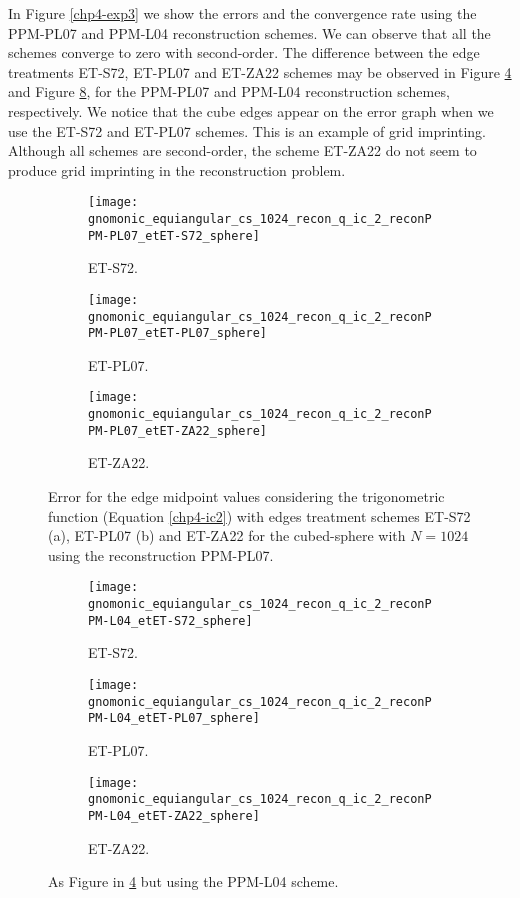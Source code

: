 In Figure \ref{chp4-exp3} we show the errors and the convergence rate using the PPM-PL07 and PPM-L04 reconstruction schemes.
We can observe that all the schemes converge to zero with second-order.
The difference between the edge treatments ET-S72, ET-PL07 and ET-ZA22 schemes
may be observed in Figure \ref{chp4-exp4} and Figure \ref{chp4-exp5}, for the  PPM-PL07 and PPM-L04 reconstruction schemes, respectively.
We notice that the cube edges appear on the error graph when we use the ET-S72 and ET-PL07 schemes. This is an example of grid imprinting.
Although all schemes are second-order, the scheme ET-ZA22 do not seem to produce grid imprinting in the reconstruction problem.
\begin{figure}[!ht]
	\centering
	\begin{subfigure}{0.3\textwidth}
		\centering
		\texttt{[image: gnomonic\_equiangular\_cs\_1024\_recon\_q\_ic\_2\_reconPPM-PL07\_etET-S72\_sphere]}
		\caption{ET-S72.\label{chp4-exp4-a}}
	\end{subfigure}
	\begin{subfigure}{0.3\textwidth}
		\centering
		\texttt{[image: gnomonic\_equiangular\_cs\_1024\_recon\_q\_ic\_2\_reconPPM-PL07\_etET-PL07\_sphere]}
		\caption{ET-PL07.\label{chp4-exp4-b}}
	\end{subfigure}
	\begin{subfigure}{0.3\textwidth}
	\centering
	\texttt{[image: gnomonic\_equiangular\_cs\_1024\_recon\_q\_ic\_2\_reconPPM-PL07\_etET-ZA22\_sphere]}
	\caption{ET-ZA22.\label{chp4-exp4-c}}
\end{subfigure}
	\caption{Error for the edge midpoint values considering the trigonometric function (Equation \eqref{chp4-ic2})
	with edges treatment schemes ET-S72 (a), ET-PL07 (b) and ET-ZA22 for the cubed-sphere with $N=1024$ using the reconstruction PPM-PL07.\label{chp4-exp4}}
\end{figure}
\begin{figure}[!ht]
	\centering
	\begin{subfigure}{0.3\textwidth}
		\centering
		\texttt{[image: gnomonic\_equiangular\_cs\_1024\_recon\_q\_ic\_2\_reconPPM-L04\_etET-S72\_sphere]}
		\caption{ET-S72.\label{chp4-exp5-a}}
	\end{subfigure}
	\begin{subfigure}{0.3\textwidth}
		\centering
		\texttt{[image: gnomonic\_equiangular\_cs\_1024\_recon\_q\_ic\_2\_reconPPM-L04\_etET-PL07\_sphere]}
		\caption{ET-PL07.\label{chp4-exp5-b}}
	\end{subfigure}
	\begin{subfigure}{0.3\textwidth}
		\centering
		\texttt{[image: gnomonic\_equiangular\_cs\_1024\_recon\_q\_ic\_2\_reconPPM-L04\_etET-ZA22\_sphere]}
		\caption{ET-ZA22.\label{chp4-exp5-c}}
	\end{subfigure}
	\caption{As Figure in \ref{chp4-exp4} but using the PPM-L04 scheme.\label{chp4-exp5}}
\end{figure}

